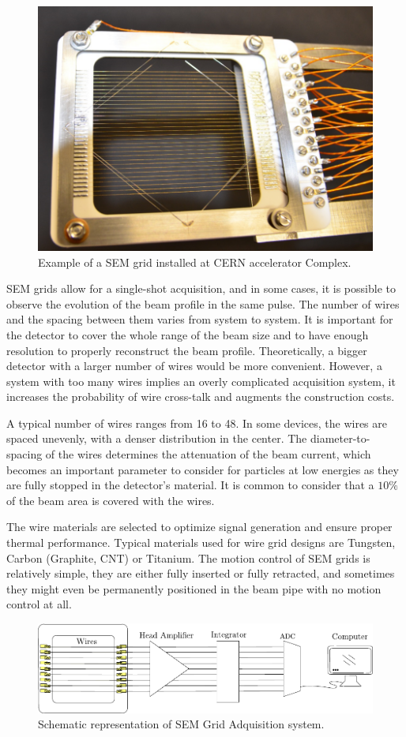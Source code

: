 \begin{figure}[h]
    \centering
    \includegraphics[width=0.6\columnwidth]{SEMGrid/semgrid.png}
    \caption{Example of a SEM grid installed at CERN accelerator Complex. }
    \label{fig:SEMgrid}
\end{figure}

SEM grids allow for a single-shot acquisition, and in some cases, it is possible to observe the evolution of the beam profile in the same pulse. The number of wires and the spacing between them varies from system to system. It is important for the detector to cover the whole range of the beam size and to have enough resolution to properly reconstruct the beam profile. Theoretically, a bigger detector with a larger number of wires would be more convenient. However, a system with too many wires implies an overly complicated acquisition system, it increases the probability of wire cross-talk and augments the construction costs. 

A typical number of wires ranges from 16 to 48. In some devices, the wires are spaced unevenly, with a denser distribution in the center. The diameter-to-spacing of the wires determines the attenuation of the beam current, which becomes an important parameter to consider for particles at low energies as they are fully stopped in the detector's material. It is common to consider that a $10 \%$ of the beam area is covered with the wires. 

The wire materials are selected to optimize signal generation and ensure proper thermal performance. Typical materials used for wire grid designs are Tungsten, Carbon (Graphite, CNT) or Titanium. The motion control of SEM grids is relatively simple, they are either fully inserted or fully retracted, and sometimes they might even be permanently positioned in the beam pipe with no motion control at all. 


\begin{figure}[h]
    \centering
    \includegraphics[width=1.0\columnwidth]{SEMgridDataADq/SEMdataAdc.pdf}
    \caption{Schematic representation of SEM Grid Adquisition system. }
    \label{fig:SEMGridReadOutSystem}
\end{figure}

